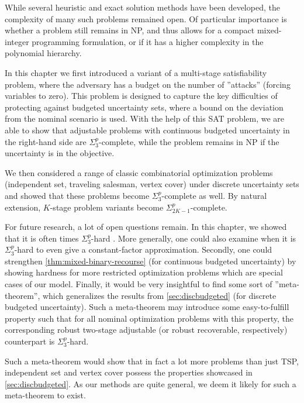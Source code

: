 While several heuristic and exact solution methods have been developed, the complexity of many such problems remained open. Of particular importance is whether a problem still remains in NP, and thus allows for a compact mixed-integer programming formulation, or if it has a higher complexity in the polynomial hierarchy. 

In this chapter we first introduced a variant of a multi-stage satisfiability problem, where the adversary has a budget on the number of ''attacks'' (forcing variables to zero). This problem is designed to capture the key difficulties of protecting against budgeted uncertainty sets, where a bound on the deviation from the nominal scenario is used. With the help of this SAT problem, we are able to show that adjustable problems with continuous budgeted uncertainty in the right-hand side are $\Sigma^p_3$-complete, while the problem remains in NP if the uncertainty is in the objective.

We then considered a range of classic combinatorial optimization problems (independent set, traveling salesman, vertex cover) under discrete uncertainty sets and showed that these problems become $\Sigma^p_3$-complete as well. By natural extension, $K$-stage problem variants become $\Sigma^p_{2K-1}$-complete.

For future research, a lot of open questions remain. In this chapter, we showed that it is often times $\Sigma^p_3$-hard . More generally, one could also examine when it is $\Sigma^p_3$-hard to even give a constant-factor approximation.
Secondly, one could strengthen \cref{thm:mixed-binary-recourse} (for continuous budgeted uncertainty) by showing hardness for more restricted optimization problems which are special cases of our model.
Finally, it would be very insightful to find some sort of ''meta-theorem'', which generalizes the results from \cref{sec:discbudgeted} (for discrete budgeted uncertainty). 
Such a meta-theorem may introduce some easy-to-fulfill property such that for all nominal optimization problems with this property, the corresponding robust two-stage adjustable (or robust recoverable, respectively)  counterpart is $\Sigma^p_3$-hard. 

Such a meta-theorem would show that in fact a lot more problems than just TSP, independent set and vertex cover possess the properties showcased in \cref{sec:discbudgeted}. As our methods are quite general, we deem it likely for such a meta-theorem to exist. 


